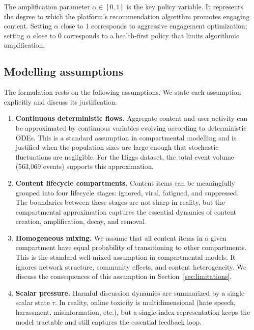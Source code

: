 \documentclass[11pt]{article}
\begin{document}
The amplification parameter $\alpha \in [0,1]$ is the key policy variable. It represents the degree to which the platform's recommendation algorithm promotes engaging content. Setting $\alpha$ close to 1 corresponds to aggressive engagement optimization; setting $\alpha$ close to 0 corresponds to a health-first policy that limits algorithmic amplification.

\subsection{Modelling assumptions}
\label{sec:assumptions}

The formulation rests on the following assumptions. We state each assumption explicitly and discuss its justification.

\begin{enumerate}[leftmargin=1.5em]
    \item \textbf{Continuous deterministic flows.} Aggregate content and user activity can be approximated by continuous variables evolving according to deterministic ODEs. This is a standard assumption in compartmental modelling and is justified when the population sizes are large enough that stochastic fluctuations are negligible. For the Higgs dataset, the total event volume (563,069 events) supports this approximation.

    \item \textbf{Content lifecycle compartments.} Content items can be meaningfully grouped into four lifecycle stages: ignored, viral, fatigued, and suppressed. The boundaries between these stages are not sharp in reality, but the compartmental approximation captures the essential dynamics of content creation, amplification, decay, and removal.

    \item \textbf{Homogeneous mixing.} We assume that all content items in a given compartment have equal probability of transitioning to other compartments. This is the standard well-mixed assumption in compartmental models. It ignores network structure, community effects, and content heterogeneity. We discuss the consequences of this assumption in Section~\ref{sec:limitations}.

    \item \textbf{Scalar pressure.} Harmful discussion dynamics are summarized by a single scalar state $\tau$. In reality, online toxicity is multidimensional (hate speech, harassment, misinformation, etc.), but a single-index representation keeps the model tractable and still captures the essential feedback loop.


\end{enumerate}
\end{document}
